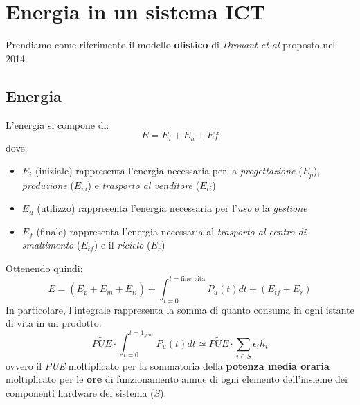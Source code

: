 \newpage
\section{Energia in un sistema ICT}
Prendiamo come riferimento il modello \textbf{olistico} di \emph{Drouant et al} proposto nel 2014.
\subsection{Energia}
L'energia si compone di:
\begin{equation}
	E = E_i + E_u + Ef
\end{equation}
dove:
\begin{itemize}
	\item \textbf{$E_i$} (iniziale) rappresenta l'energia necessaria per la \emph{progettazione} ($E_p$), \emph{produzione} ($E_m$) e \emph{trasporto al venditore} ($E_{ti}$)
	\item \textbf{$E_u$} (utilizzo) rappresenta l'energia necessaria per l'\emph{uso} e la \emph{gestione}
	\item \textbf{$E_f$} (finale) rappresenta l'energia necessaria al \emph{trasporto al centro di smaltimento} ($E_{tf}$) e il \emph{riciclo} ($E_r$)
\end{itemize}
Ottenendo quindi:
\begin{equation}
	E = (E_p + E_m + E_{ti}) + \int_{t=0}^{t=\text{fine vita}}P_u(t)dt + (E_{tf} + E_r)
\end{equation}
In particolare, l'integrale rappresenta la somma di quanto consuma in ogni istante di vita in un prodotto:
\begin{equation}
	\tilde{PUE} \cdot \int_{t=0}^{t=1_{year}} P_u(t)dt \simeq \tilde{PUE} \cdot \sum_{i \in S} \epsilon_i h_i
\end{equation}
ovvero il \emph{PUE} moltiplicato per la sommatoria della \textbf{potenza media oraria} moltiplicato per le \textbf{ore} di funzionamento annue di ogni elemento dell'insieme dei componenti hardware del sistema ($S$).\\

